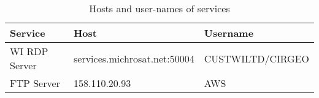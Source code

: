 \begin{table}[H]
\centering
\begin{tabular}{|l|l|l|}
\hline
\textbf{Service}        & \textbf{Host}                & \textbf{Username} \\ \hline
WI RDP Server	        & services.michrosat.net:50004 & CUSTWILTD/CIRGEO \\ \hline
FTP Server              & 158.110.20.93				   & AWS               \\ \hline
\end{tabular}
\caption{Hosts and user-names of services}
\label{tab:hostuser}
\end{table}
